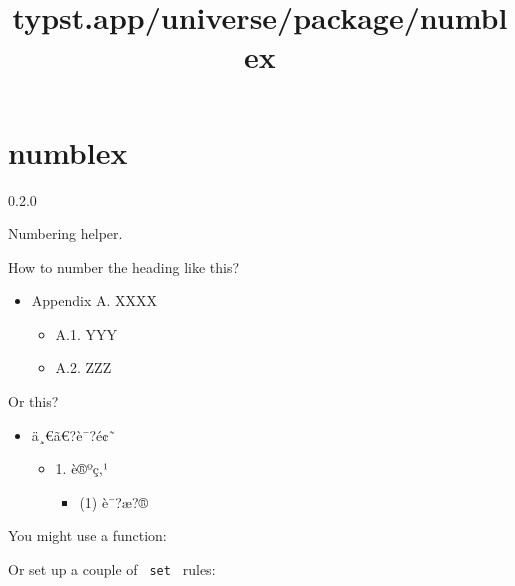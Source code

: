 \title{typst.app/universe/package/numblex}

\label{banner}
\section{numblex}\label{numblex}

{ 0.2.0 }

Numbering helper.

\label{readme}
How to number the heading like this?

\begin{itemize}
\tightlist
\item
  Appendix A. XXXX

  \begin{itemize}
  \tightlist
  \item
    A.1. YYY
  \item
    A.2. ZZZ
  \end{itemize}
\end{itemize}

Or this?

\begin{itemize}
\tightlist
\item
  ä¸€ã€?è¯?é¢˜

  \begin{itemize}
  \tightlist
  \item
    1. è®ºç‚¹

    \begin{itemize}
    \tightlist
    \item
      (1) è¯?æ?®
    \end{itemize}
  \end{itemize}
\end{itemize}

You might use a function:

\begin{Shaded}
\begin{Highlighting}[]
\NormalTok{  \}}
\NormalTok{\}}
\end{Highlighting}
\end{Shaded}

Or set up a couple of \texttt{\ set\ } rules:

\begin{Shaded}
\begin{Highlighting}[]
\end{Highlighting}
\end{Shaded}

